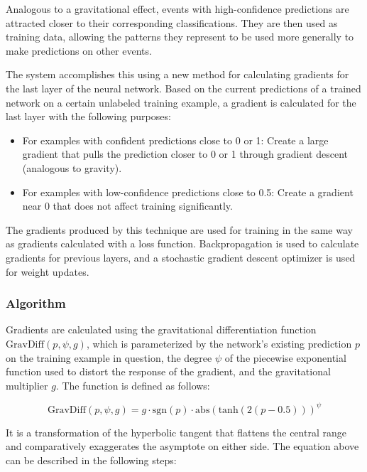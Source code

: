 \documentclass[10pt]{article}
\begin{document}
Analogous to a gravitational effect, events with high-confidence predictions are attracted closer to their corresponding classifications. They are then used as training data, allowing the patterns they represent to be used more generally to make predictions on other events.

The system accomplishes this using a new method for calculating gradients for the last layer of the neural network. Based on the current predictions of a trained network on a certain unlabeled training example, a gradient is calculated for the last layer with the following purposes:

\begin{itemize}
    \item For examples with confident predictions close to 0 or 1: Create a large gradient that pulls the prediction closer to 0 or 1 through gradient descent (analogous to gravity).
    \item For examples with low-confidence predictions close to 0.5: Create a gradient near 0 that does not affect training significantly.
\end{itemize}

The gradients produced by this technique are used for training in the same way as gradients calculated with a loss function. Backpropagation is used to calculate gradients for previous layers, and a stochastic gradient descent optimizer \cite{sgd} is used for weight updates.

\subsubsection{Algorithm}

Gradients are calculated using the gravitational differentiation function $\mathrm{GravDiff}(p, \psi, g)$, which is parameterized by the network's existing prediction $p$ on the training example in question, the degree $\psi$ of the piecewise exponential function used to distort the response of the gradient, and the gravitational multiplier $g$. The function is defined as follows:

\begin{equation}
    \mathrm{GravDiff}(p, \psi, g) = g \cdot \mathrm{sgn}(p) \cdot \mathrm{abs}(\mathrm{tanh}(2(p - 0.5))) ^ \psi
\end{equation}

It is a transformation of the hyperbolic tangent that flattens the central range and comparatively exaggerates the asymptote on either side. The equation above can be described in the following steps:
\end{document}
